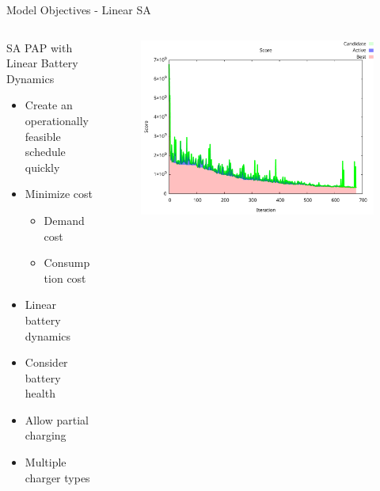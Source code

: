 \documentclass[aspectratio=169,dvipsnames]{beamer}
\begin{document}
\begin{frame}[label={sec:org14a6ae4}]{Model Objectives - Linear SA}
\begin{columns}
\begin{column}{0.5\columnwidth}
\begin{exampleblock}{SA PAP with Linear Battery Dynamics}
{\footnotesize
\begin{itemize}
\item Create an operationally feasible schedule quickly
\item Minimize cost
\begin{itemize}
\item Demand cost
\item Consumption cost
\end{itemize}
\item Linear battery dynamics
\item Consider battery health
\item Allow partial charging
\item Multiple charger types
\end{itemize}
}
\end{exampleblock}
\end{column}

\begin{column}{0.5\columnwidth}
\begin{figure}[htpb]
\centering
    \includegraphics[width=\textwidth]{img/score-convergence}
\end{figure}
\end{column}
\end{columns}
\end{frame}
\end{document}

